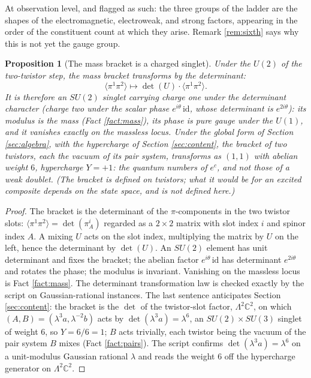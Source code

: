 \documentclass[11pt]{article}
\newtheorem{proposition}[theorem]{Proposition}
\theoremstyle{definition}
\newcommand{\C}{\mathbb{C}}
\newcommand{\id}{\mathrm{id}}
\newcommand{\br}[1]{\langle #1\rangle}
\begin{document}
At observation level, and flagged as such: the three groups of the ladder are the shapes of the electromagnetic, electroweak, and strong factors, appearing in the order of the constituent count at which they arise. Remark \ref{rem:sixth} says why this is not yet the gauge group.

\begin{proposition}[The mass bracket is a charged singlet]\label{prop:singlet}
Under the $U(2)$ of the two-twistor step, the mass bracket transforms by the determinant:
\[
\br{\pi^{1}\pi^{2}} \mapsto \det(U) \cdot \br{\pi^{1}\pi^{2}}.
\]
It is therefore an $SU(2)$ singlet carrying charge one under the determinant character (charge two under the scalar phase $e^{i\theta}\,\id$, whose determinant is $e^{2i\theta}$): its modulus is the mass (Fact \ref{fact:mass}), its phase is pure gauge under the $U(1)$, and it vanishes exactly on the massless locus. Under the global form of Section \ref{sec:algebra}, with the hypercharge of Section \ref{sec:content}, the bracket of two twistors, each the vacuum of its pair system, transforms as $(1, 1)$ with abelian weight $6$, hypercharge $Y = +1$: the quantum numbers of $e^{c}$, and not those of a weak doublet. (The bracket is defined on twistors; what it would be for an excited composite depends on the state space, and is not defined here.)
\end{proposition}

\begin{proof}
The bracket is the determinant of the $\pi$-components in the two twistor slots: $\br{\pi^{1}\pi^{2}} = \det(\pi^{i}_{A})$ regarded as a $2 \times 2$ matrix with slot index $i$ and spinor index $A$. A mixing $U$ acts on the slot index, multiplying the matrix by $U$ on the left, hence the determinant by $\det(U)$. An $SU(2)$ element has unit determinant and fixes the bracket; the abelian factor $e^{i\theta}\,\id$ has determinant $e^{2i\theta}$ and rotates the phase; the modulus is invariant. Vanishing on the massless locus is Fact \ref{fact:mass}. The determinant transformation law is checked exactly by the script on Gaussian-rational instances. The last sentence anticipates Section \ref{sec:content}: the bracket is the $\det$ of the twistor-slot factor, $\Lambda^{2}\C^{2}$, on which $(A, B) = (\lambda^{3}a, \lambda^{-2}b)$ acts by $\det(\lambda^{3}a) = \lambda^{6}$, an $SU(2) \times SU(3)$ singlet of weight $6$, so $Y = 6/6 = 1$; $B$ acts trivially, each twistor being the vacuum of the pair system $B$ mixes (Fact \ref{fact:pairs}). The script confirms $\det(\lambda^{3}a) = \lambda^{6}$ on a unit-modulus Gaussian rational $\lambda$ and reads the weight $6$ off the hypercharge generator on $\Lambda^{2}\C^{2}$.
\end{proof}
\end{document}
